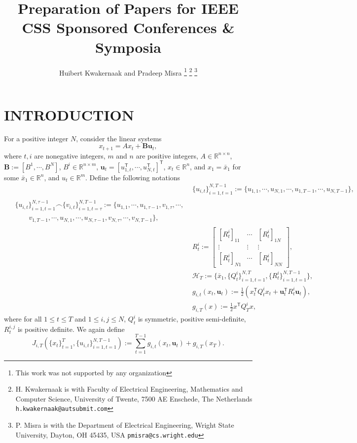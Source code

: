 \documentclass[letterpaper, 10 pt, conference]{ieeeconf}  %
\title{\LARGE \bf
Preparation of Papers for IEEE CSS Sponsored Conferences \& Symposia
}
\author{Huibert Kwakernaak and Pradeep Misra%
\thanks{This work was not supported by any organization}%
\thanks{H. Kwakernaak is with Faculty of Electrical Engineering, Mathematics and Computer Science,
        University of Twente, 7500 AE Enschede, The Netherlands
        {\tt\small h.kwakernaak@autsubmit.com}}%
\thanks{P. Misra is with the Department of Electrical Engineering, Wright State University,
        Dayton, OH 45435, USA
        {\tt\small pmisra@cs.wright.edu}}%
}
\newcommand{\transpose}{\mathsf{T}}
\begin{document}
\maketitle
\thispagestyle{empty}
\pagestyle{empty}


\begin{abstract}

\end{abstract}


\section{INTRODUCTION}
For a positive integer $N$, consider the linear systems
\begin{equation}\label{eq:linsys}
    x_{t+1} = Ax_{t} + \mathbf{B}\mathbf{u}_{t},
\end{equation}
where $t,i$ are nonegative integers, $m$ and $n$ are positive integers, $A \in \mathbb{R}^{n\times n}$, $\mathbf{B} := [B^{1},\cdots, B^{N}]$, $B^{i} \in \mathbb{R}^{n\times m}$, $\mathbf{u}_{t} = [u_{1,t}^{\transpose},\cdots,u_{N,t}^{\transpose}]^{\transpose}$, $x_t\in\mathbb{R}^n$, and $x_{1} =\bar{x}_{1}$ for some $\bar{x}_1 \in \mathbb{R}^{n}$, and $u_{t} \in \mathbb{R}^{m}$.
Define the following notations
\begin{align}
    &\{u_{i,t}\}_{i=1,t=1}^{N,T-1} := \{u_{1,1},\cdots,u_{N,1},\cdots, u_{1,T-1},\cdots,u_{N,T-1}\},\\
    \begin{split}
         &\{u_{i,t}\}_{i=1,t=1}^{N,\tau-1} \frown \{v_{i,t}\}_{i=1,t=\tau}^{N,T-1}:=\{u_{1,1},\cdots,u_{1,\tau-1},v_{1,\tau},\cdots,\\
    &\qquad v_{1,T-1},\cdots,u_{N,1},\cdots,u_{N,\tau-1},v_{N,\tau},\cdots,v_{N,T-1} \},
    \end{split}
   \\ 
   & R_{t}^{i} := 
   \begin{bmatrix}
       [R_{t}^{i}]_{11} & \cdots & [R_{t}^{i}]_{1N}\\
       \vdots & \vdots & \vdots\\
       [R_{t}^{i}]_{N1} & \cdots & [R_{t}^{i}]_{NN}
   \end{bmatrix},\\
    \label{eq:history}
    &\mathcal{H}_{T} := \{ \bar{x}_{1},\{Q_{t}^{i}\}_{i=1,t=1}^{N,T},\{R_{t}^{i}\}_{i=1,t=1}^{N,T-1}\},\\
    &g_{i,t}(x_{t}, \mathbf{u}_{t}) := \frac{1}{2}(x_{t}^{\mathsf{T}}Q_{t}^{i}x_{t} + 
    \mathbf{u}_{t}^{\transpose}R_{t}^{i}\mathbf{u}_{t}),\\
    &g_{i,T}(x) := \frac{1}{2} x^{\mathsf{T}}Q_{T}^{i}x,
\end{align}
where for all $1 \leq t \leq T$ and $1\leq i,j\leq N$, $Q_{t}^{i}$ is symmetric, positive semi-definite, $R_{t}^{i,j}$ is positive definite. We again define
\begin{equation}
    J_{i,T}(\{x_{t}\}_{t=1}^{T},\{u_{i,t}\}_{i=1,t=1}^{N,T-1}) := \sum_{t=1}^{T-1} g_{i,t}(x_{t}, \mathbf{u}_{t}) + g_{i,T}(x_{T}).
\end{equation}
\end{document}
